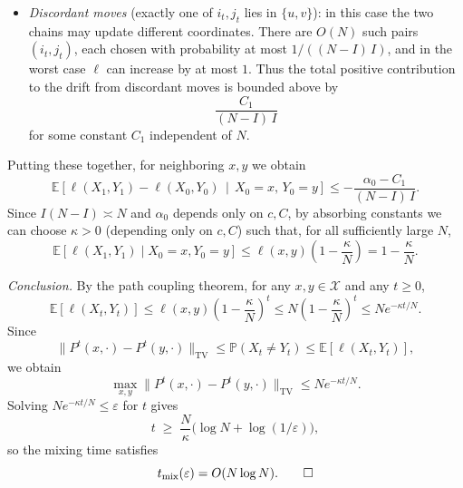 \documentclass[answers,12pt,addpoints]{exam}
\begin{document}
\begin{enumerate}
\begin{solution}
\begin{itemize}
\item \emph{Discordant moves} (exactly one of $i_t,j_t$ lies in
  $\{u,v\}$): in this case the two chains may update different
  coordinates. There are $O(N)$ such pairs $(i_t,j_t)$, each chosen with
  probability at most $1/((N-I)\,I)$, and in the worst case $\ell$ can
  increase by at most $1$. Thus the total positive contribution to the
  drift from discordant moves is bounded above by
  \[
    \frac{C_1}{(N-I)\,I}
  \]
  for some constant $C_1$ independent of $N$.
\end{itemize}

Putting these together, for neighboring $x,y$ we obtain
\[
  \mathbb{E}\!\left[\ell(X_1,Y_1) - \ell(X_0,Y_0)
    \,\middle|\, X_0 = x,\, Y_0 = y\right]
  \le -\frac{\alpha_0 - C_1}{(N-I)\,I}.
\]
Since $I(N-I) \asymp N$ and $\alpha_0$ depends only on $c,C$, by
absorbing constants we can choose $\kappa > 0$ (depending only on
$c,C$) such that, for all sufficiently large $N$,
\[
  \mathbb{E}[\ell(X_1,Y_1) \mid X_0=x,Y_0=y]
  \le \ell(x,y)\left(1 - \frac{\kappa}{N}\right)
  = 1 - \frac{\kappa}{N}.
\]

\medskip\noindent
\textit{Conclusion.}
By the path coupling theorem, for any $x,y \in \mathcal{X}$ and any
$t \ge 0$,
\[
  \mathbb{E}[\ell(X_t,Y_t)]
  \le \ell(x,y)\left(1 - \frac{\kappa}{N}\right)^t
  \le N\left(1 - \frac{\kappa}{N}\right)^t
  \le N e^{-\kappa t/N}.
\]
Since
\[
  \|P^t(x,\cdot) - P^t(y,\cdot)\|_{\mathrm{TV}}
  \le \mathbb{P}(X_t \neq Y_t)
  \le \mathbb{E}[\ell(X_t,Y_t)],
\]
we obtain
\[
  \max_{x,y} \|P^t(x,\cdot) - P^t(y,\cdot)\|_{\mathrm{TV}}
  \le N e^{-\kappa t/N}.
\]
Solving $N e^{-\kappa t/N} \le \varepsilon$ for $t$ gives
\[
  t \;\ge\; \frac{N}{\kappa}\bigl(\log N + \log(1/\varepsilon)\bigr),
\]
so the mixing time satisfies
\[
  t_{\mathrm{mix}}(\varepsilon) = O(N \log N). \qedhere
\]
\end{solution}
\end{enumerate}
\end{document}
